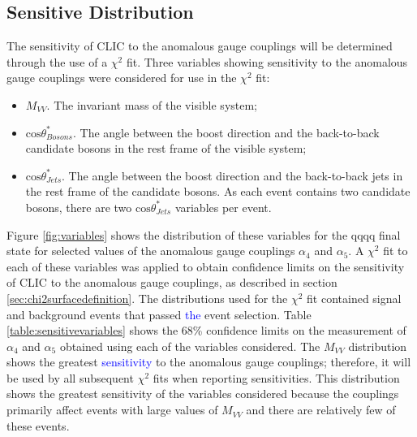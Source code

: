 \subsection{Sensitive Distribution}
The sensitivity of CLIC to the anomalous gauge couplings will be determined through the use of a $\chi^{2}$ fit.  Three variables showing sensitivity to the anomalous gauge couplings were considered for use in the $\chi^{2}$ fit:
\begin{itemize}
\item \textbf{$M_{VV}$}.  The invariant mass of the visible system;
\item \textbf{$\text{cos}\theta^{*}_{Bosons}$}.  The angle between the boost direction and the back-to-back candidate bosons in the rest frame of the visible system;
\item \textbf{$\text{cos}\theta^{*}_{Jets}$}.  The angle between the boost direction and the back-to-back jets in the rest frame of the candidate bosons.  As each event contains two candidate bosons, there are two $\text{cos}\theta^{*}_{Jets}$ variables per event. 
\end{itemize}

Figure \ref{fig:variables} shows the distribution of these variables for the  \nu{\nu}qqqq final state for selected values of the anomalous gauge couplings $\alpha_{4}$ and $\alpha_{5}$.  A $\chi^{2}$ fit to each of these variables was applied to obtain confidence limits on the sensitivity of CLIC to the anomalous gauge couplings, as described in section \ref{sec:chi2surfacedefinition}.  The distributions used for the $\chi^{2}$ fit contained signal and background events that passed \textcolor{blue}{the} event selection.  Table \ref{table:sensitivevariables} shows the 68\% confidence limits on the measurement of $\alpha_{4}$ and $\alpha_{5}$ obtained using each of the variables considered.  The $M_{VV}$ distribution shows the greatest \textcolor{blue}{sensitivity} to the anomalous gauge couplings; therefore, it will be used by all subsequent $\chi^{2}$ fits when reporting sensitivities.  This distribution shows the greatest sensitivity of the variables considered because the couplings primarily affect events with large values of $M_{VV}$ and there are relatively few of these events.    

